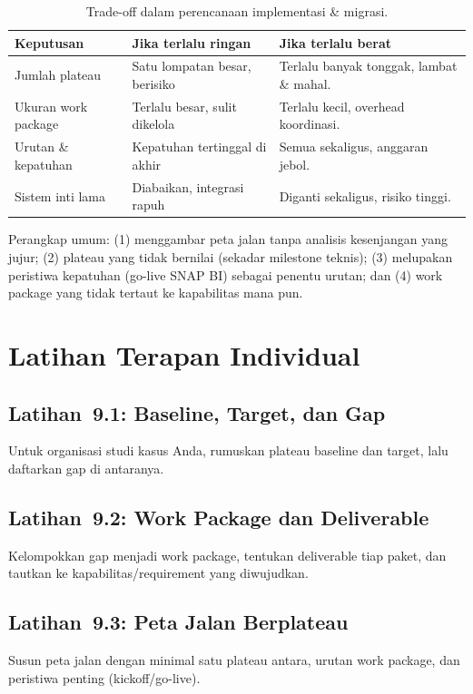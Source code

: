 \begin{table}[htbp]
\centering
\scriptsize
\caption{Trade-off dalam perencanaan implementasi \& migrasi.}
\label{tab:tradeoff-bab8-impl}
\begin{tabularx}{\textwidth}{@{}p{} X X@{}}
\hline
\textbf{Keputusan} & \textbf{Jika terlalu ringan} & \textbf{Jika terlalu berat} \\
\hline
Jumlah plateau & Satu lompatan besar, berisiko & Terlalu banyak tonggak,
lambat \& mahal. \\
Ukuran work package & Terlalu besar, sulit dikelola & Terlalu kecil, overhead
koordinasi. \\
Urutan \& kepatuhan & Kepatuhan tertinggal di akhir & Semua sekaligus, anggaran
jebol. \\
Sistem inti lama & Diabaikan, integrasi rapuh & Diganti sekaligus, risiko
tinggi. \\
\hline
\end{tabularx}
\end{table}

Perangkap umum: (1) menggambar peta jalan tanpa analisis kesenjangan yang jujur;
(2) plateau yang tidak bernilai (sekadar milestone teknis); (3) melupakan
peristiwa kepatuhan (go-live SNAP BI) sebagai penentu urutan; dan (4) work package
yang tidak tertaut ke kapabilitas mana pun.

\section{Latihan Terapan Individual}

\subsection*{Latihan~9.1: Baseline, Target, dan Gap}
Untuk organisasi studi kasus Anda, rumuskan plateau baseline dan target, lalu
daftarkan gap di antaranya.

\subsection*{Latihan~9.2: Work Package dan Deliverable}
Kelompokkan gap menjadi work package, tentukan deliverable tiap paket, dan tautkan
ke kapabilitas/requirement yang diwujudkan.

\subsection*{Latihan~9.3: Peta Jalan Berplateau}
Susun peta jalan dengan minimal satu plateau antara, urutan work package, dan
peristiwa penting (kickoff/go-live).

